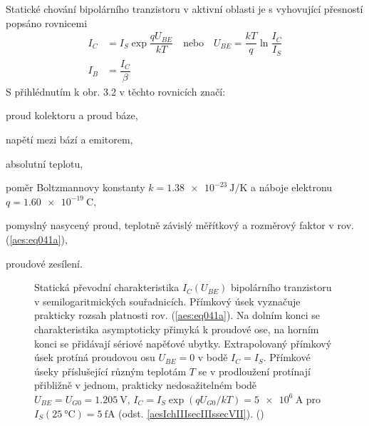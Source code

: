       Statické chování bipolárního tranzistoru v aktivní oblasti je s vyhovující přesností popsáno
      rovnicemi
      \begin{subequations}\label{aes:eq041}
        \begin{align}
          I_C    &= I_S\exp\dfrac{qU_{BE}}{kT} \quad\text{nebo}\quad      
          U_{BE}  = \dfrac{kT}{q}\ln\dfrac{I_C}{I_S}                      \label{aes:eq041a}   \\
          I_B    &= \dfrac{I_C}{\beta}                                    \label{aes:eq041b} 
        \end{align}
      \end{subequations}
      S přihlédnutím k obr. 3.2 v těchto rovnicích značí:
      \begin{description}[leftmargin=5em,labelindent=2em, style=nextline]
        \item [\(I_C\), \(I_B\)] proud kolektoru a  proud báze, 
        \item [\(U_{BE}\)] napětí mezi bází a emitorem,
        \item [\(T\)] absolutní teplotu, 
        \item [\(k/q = \SI{86.2}{\micro\volt\per\kelvin}\)] poměr Boltzmannovy konstanty
              \(k = \SI{1.38e-23}{\joule\per\kelvin}\) a náboje elektronu \(q =
              \SI{1.60e-19}{\coulomb}\), 
        \item [\(I_S\)] pomyslný nasycený proud, teplotně závislý měřítkový a rozměrový faktor v
              rov. (\ref{aes:eq041a}),
        \item [\(\beta\)]  proudové zesílení.
      \end{description}

      \begin{figure}[ht!] %
        \centering
        \caption{ Statická převodní charakteristika \(I_C(U_{BE})\) bipolárního tranzistoru v
                  semilogaritmických souřadnicích. Přímkový úsek vyznačuje prakticky rozsah
                  platnosti rov. (\ref{aes:eq041a}). Na dolním konci se charakteristika asymptoticky
                  přimyká k proudové ose, na horním konci se přidávají sériové napěťové ubytky.
                  Extrapolovaný přímkový úsek protíná proudovou osu \(U_{BE} = 0\) v bodě \(I_C =
                  I_S\). Přímkové úseky příslušející různým teplotám \(T\) se v prodloužení
                  protínají přibližně v jednom, prakticky nedosažitelném bodě \(U_{BE} = U_{G0} =
                  \SI{1.205}{\V}\), \(I_C = I_S\exp(qU_{G0}/kT) = \SI{5e6}{\A}\) pro
                  \(I_S(\SI{25}{\degreeCelsius}) = \SI{5}{\femto\A}\) (odst.
                  \ref{aesIchIIIsecIIIssecVII}). (\cite[s.~38]{Dostal})}
        \label{aes:fig061}
      \end{figure}
      
